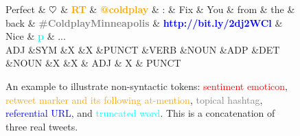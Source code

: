\documentclass[11pt,a4paper]{article}
\newcommand{\heart}{\ensuremath\heartsuit}
\begin{document}
\begin{figure}[t]
	\centering
	\small
	\begin{dependency}[edge slant=2, text only label, label style=above]
		\begin{deptext}
			Perfect \& \textcolor{red}{\bf $\heart$} \& \textcolor{orange}{\bf RT} \& \textcolor{orange}{\bf @coldplay} \& : \& Fix \& You \& from \& the \& back \& \textcolor{gray}{\bf \#ColdplayMinneapolis} \& \textcolor{blue}{\bf http://bit.ly/2dj2WCl} \& Nice \& \textcolor{cyan}{\bf p} \& ...\\
			\tiny ADJ \&\tiny SYM \&\tiny X \&\tiny X \&\tiny PUNCT \&\tiny VERB \&\tiny NOUN \&\tiny ADP \&\tiny DET \&\tiny NOUN \&\tiny X \&\tiny X \& \tiny ADJ \& \tiny X \& \tiny PUNCT \\
		\end{deptext}
	\end{dependency}
	\caption{An example to illustrate non-syntactic tokens:
		\textcolor{red}{sentiment emoticon},
		\textcolor{orange}{retweet marker and its following at-mention},
		\textcolor{gray}{topical hashtag},
		\textcolor{blue}{referential URL}, and
		\textcolor{cyan}{truncated word}.
		This is a concatenation of three real tweets.
	}\label{fig:non-syn-toks}
\end{figure}
\end{document}
